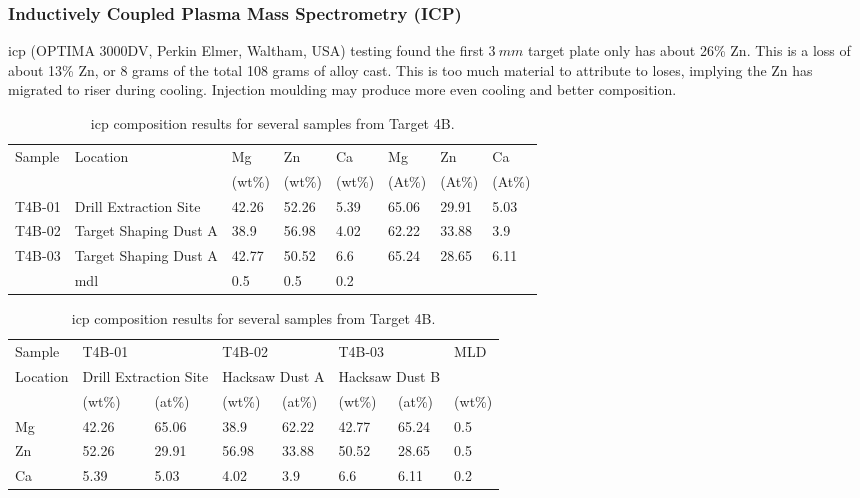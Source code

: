 \documentclass[a4paper,12pt,oneside]{report}%
\begin{document}
\subsubsection{Inductively Coupled Plasma Mass Spectrometry (ICP)}
\Gls{icp} (OPTIMA 3000DV, Perkin Elmer, Waltham, USA) testing found the first $3~ mm$ target plate only has about 26\% Zn. This is a loss of about 13\% Zn, or 8 grams of the total 108 grams of alloy cast.  This is too much material to attribute to loses, implying the Zn has migrated to riser during cooling. Injection moulding may produce more even cooling and better composition. 

\begin{table}[H]
	\centering
	\begin{tabular}{l l l l l l l l}
		\toprule
		Sample & Location & Mg & Zn & Ca & Mg & Zn & Ca \\ 
		& & (wt\%) & (wt\%) & (wt\%) & (At\%) & (At\%) & (At\%) \\ 
		\midrule
		T4B-01 & Drill Extraction Site & 42.26 & 52.26 & 5.39 & 65.06 & 29.91 & 5.03 \\ 
		T4B-02 & Target Shaping Dust A & 38.9 & 56.98 & 4.02 & 62.22 & 33.88 & 3.9 \\
		T4B-03 & Target Shaping Dust A & 42.77 & 50.52 & 6.6 & 65.24 & 28.65 & 6.11 \\
		\midrule
		& \acrshort{mdl} & 0.5 & 0.5 & 0.2 &  &  &  \\
		\bottomrule
	\end{tabular}
	\caption{\acrshort{icp} composition results for several samples from Target 4B.}
	\label{tab:ICPT4B}
\end{table}

\begin{table}[H]
	\centering
	\begin{tabular}{ l l l l l l l l }
		\toprule
		Sample & \multicolumn{2}{l}{T4B-01} & \multicolumn{2}{l}{T4B-02} & \multicolumn{2}{l}{T4B-03} & MLD \\
		Location & \multicolumn{2}{l}{Drill Extraction Site} & \multicolumn{2}{l}{Hacksaw Dust A} & \multicolumn{2}{l}{Hacksaw Dust B}  &  \\
		& (wt\%) & (at\%) & (wt\%) & (at\%) & (wt\%) & (at\%) & (wt\%) \\
		\midrule
		Mg & 42.26 & 65.06 & 38.9 & 62.22 & 42.77 & 65.24 & 0.5 \\
		Zn & 52.26 & 29.91 & 56.98 & 33.88 & 50.52 & 28.65 & 0.5 \\
		Ca & 5.39 & 5.03 & 4.02 & 3.9 & 6.6 & 6.11 & 0.2 \\
		\bottomrule
	\end{tabular}
	\caption{\acrshort{icp} composition results for several samples from Target 4B.}
	\label{tab:ICPT4B_V2}
\end{table}
\end{document}
